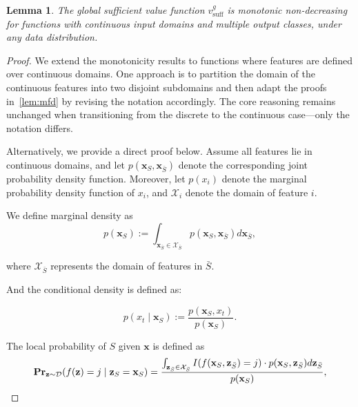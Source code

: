 \documentclass{article}
\newtheorem{lemma}{Lemma}
\newcommand{\z}{\textbf{z}}
\newcommand{\x}{\textbf{x}}
\newcommand{\fml}[1]{{\mathcal{#1}}}
\newcommand{\mbf}[1]{\ensuremath\mathbf{#1}}
\begin{document}
\begin{lemma} \label{lem:confd}
The global sufficient value function $v^g_{\text{suff}}$
is monotonic non-decreasing for functions with continuous input domains 
and multiple output classes, under any data distribution.
\end{lemma}
%
\begin{proof}
We extend the monotonicity results to functions where features are defined over continuous domains. One approach is to partition the domain of the continuous features into two disjoint subdomains and then adapt the proofs in~\cref{lem:mfd} by revising the notation accordingly. The core reasoning remains unchanged when transitioning from the discrete to the continuous case—only the notation differs.

Alternatively, we provide a direct proof below.
Assume all features lie in continuous domains, and let $p(\x_{S}, \x_{\bar{S}})$ denote the corresponding joint probability density function. Moreover, let $p(x_i)$ denote the marginal probability density function of $x_i$, and $\fml{X}_i$ denote the domain of feature $i$.

We define marginal density as
\begin{equation}
p(\x_{S}) := \int_{\x_{\bar{S}} \in \fml{X}_{\bar{S}}} p(\x_{S}, \x_{\bar{S}}) d\x_{\bar{S}},
\end{equation}


where $\fml{X}_{\bar{S}}$ represents the domain of features in $\bar{S}$.

And the conditional density is defined as:

\begin{equation}
p(x_t \mid \x_{S}) := \frac{p(\x_{S}, x_t)}{p(\x_{S})}.
\end{equation}


The local probability of $S$ given $\x$ is defined as
\begin{equation}
\mbf{Pr}_{\z\sim \mathcal{D}}(f(\z) = j \mid \z_{S} = \x_{S})
=\frac{\int_{\z_{\bar{S}} \in \fml{X}_{\bar{S}}} I(f(\x_{S}, \z_{\bar{S}})=j) \cdot p(\x_{S}, \z_{\bar{S}}) d\z_{\bar{S}}}{p(\x_{S})},
\end{equation}


\end{proof}
\end{document}
